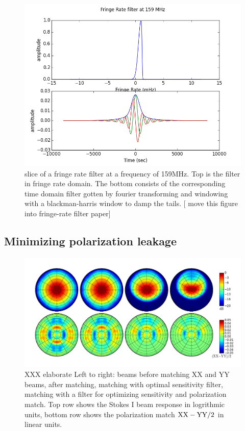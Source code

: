 \documentclass[twocolumn,apj,numberedappendix]{emulateapj}
\begin{document}
\begin{figure}[!t]
\centering
\includegraphics[width=\columnwidth]{plots/fr_filter_slice.png}
\caption{
slice of a fringe rate filter at a frequency of 159MHz. Top is the
filter in fringe rate domain. The bottom consists of the corresponding time
domain filter gotten by fourier transforming and windowing with a
blackman-harris window to damp the tails.
[ move this figure into fringe-rate filter paper]
}
\label{fig:fringe_rate_cut}
\end{figure}


\subsection{Minimizing polarization leakage}
\label{sec:polbeams}
\def\VXX{{V_{\rm XX}}}
\def\VYY{{V_{\rm YY}}}
\def\VI{{V_{\rm I}}}
\def\VQ{{V_{\rm Q}}}

\begin{figure}\centering
\includegraphics[width=.9\columnwidth]{plots/pol_match.png}
\caption{
XXX elaborate
Left to right: beams before matching XX and YY beams, after matching, matching with optimal sensitivity filter, 
matching with a filter for optimizing sensitivity and polarization match.  Top row shows the Stokes I beam 
response in logrithmic units,
bottom row shows the polarization match ${\rm XX-YY}/2$ in linear units.
}\label{fig:pol_match}
\end{figure}
\end{document}
